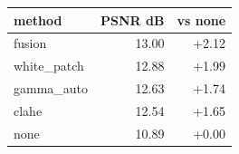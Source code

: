 \begin{tabular}{lrr}
\toprule
method & PSNR dB & vs none \\
\midrule
fusion & 13.00 & +2.12 \\
white\_patch & 12.88 & +1.99 \\
gamma\_auto & 12.63 & +1.74 \\
clahe & 12.54 & +1.65 \\
none & 10.89 & +0.00 \\
\bottomrule
\end{tabular}
